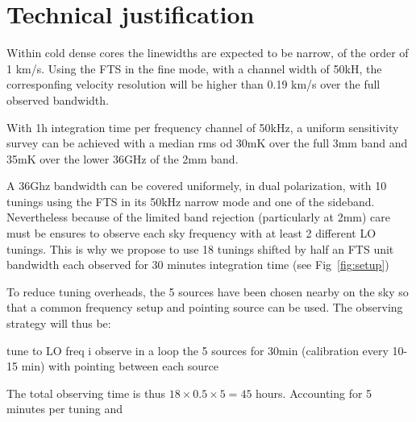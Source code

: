 \section{Technical justification}
  Within cold dense cores the linewidths are expected to be narrow, of the order of 1 km/s. Using the FTS in the fine mode, with a channel width of 50kH, the corresponfing velocity resolution will be higher than 0.19 km/s over the full observed bandwidth. 

With 1h integration time per frequency channel of 50kHz, a uniform sensitivity survey can be achieved with a median rms od 30mK over the full 3mm band and 35mK over the lower 36GHz of the 2mm band. 

A 36Ghz bandwidth can be covered uniformely, in dual polarization, with 10 tunings using the FTS in its 50kHz narrow mode and one of the sideband. Nevertheless because of the limited band rejection (particularly at 2mm) care must be ensures to observe each sky frequency with at least 2 different LO tunings. This is why we propose to use 18 tunings shifted by half an FTS unit bandwidth each observed for 30 minutes integration time (see Fig~\ref{fig:setup})

To reduce tuning overheads, the 5 sources have been chosen nearby on the sky so that a common frequency setup and pointing source can be used. The observing strategy will thus be: 

tune to LO freq i
observe in a loop the 5 sources for 30min (calibration every 10-15 min) with pointing between each source 

The total observing time is thus $18\times0.5\times5=45$ hours. Accounting for 5 minutes per tuning and 
   
  
  
  
  
  
  
  
  